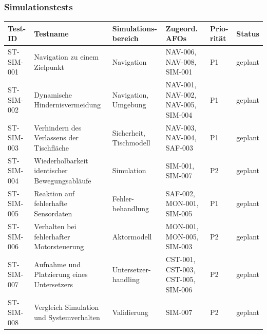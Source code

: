 \documentclass[
  a4paper,
  12pt,
  DIV=12,        %
  parskip=half,  %
  headings=small %
]{scrartcl}
\theoremstyle{definition}
\theoremstyle{definition}
\begin{document}
\newpage

\begin{landscape}
\subsubsection{Simulationstests}\label{simulationstests-2}

\begin{longtable}[]{@{}
  >{\raggedright\arraybackslash}p{}
  >{\raggedright\arraybackslash}p{}
  >{\raggedright\arraybackslash}p{}
  >{\raggedright\arraybackslash}p{}
  >{\raggedright\arraybackslash}p{}
  >{\raggedright\arraybackslash}p{}@{}}
\toprule\noalign{}
\begin{minipage}[b]{\linewidth}\raggedright
Test-ID
\end{minipage} & \begin{minipage}[b]{\linewidth}\raggedright
Testname
\end{minipage} & \begin{minipage}[b]{\linewidth}\raggedleft
Simulations-bereich
\end{minipage} & \begin{minipage}[b]{\linewidth}\raggedright
Zugeord. AFOs
\end{minipage} & \begin{minipage}[b]{\linewidth}\raggedright
Prio-rität
\end{minipage} & \begin{minipage}[b]{\linewidth}\raggedright
Status
\end{minipage} \\
\midrule\noalign{}
\endhead
\bottomrule\noalign{}
\endlastfoot
ST-SIM-001 & Navigation zu einem Zielpunkt & Navigation & NAV-006,
NAV-008, SIM-001 & P1 & geplant \\
ST-SIM-002 & Dynamische Hindernisvermeidung & Navigation, Umgebung &
NAV-001, NAV-002, NAV-005, SIM-004 & P1 & geplant \\
ST-SIM-003 & Verhindern des Verlassens der Tischfläche & Sicherheit,
Tischmodell & NAV-003, NAV-004, SAF-003 & P1 & geplant \\
ST-SIM-004 & Wiederholbarkeit identischer Bewegungsabläufe & Simulation
& SIM-001, SIM-007 & P2 & geplant \\
ST-SIM-005 & Reaktion auf fehlerhafte Sensordaten & Fehler-behandlung &
SAF-002, MON-001, SIM-005 & P1 & geplant \\
ST-SIM-006 & Verhalten bei fehlerhafter Motorsteuerung & Aktormodell &
MON-001, MON-005, SIM-003 & P2 & geplant \\
ST-SIM-007 & Aufnahme und Platzierung eines Untersetzers &
Untersetzer-handling & CST-001, CST-003, CST-005, SIM-006 & P2 &
geplant \\
ST-SIM-008 & Vergleich Simulation und Systemverhalten & Validierung &
SIM-007 & P2 & geplant \\
\end{longtable}
\end{landscape}
\end{document}
